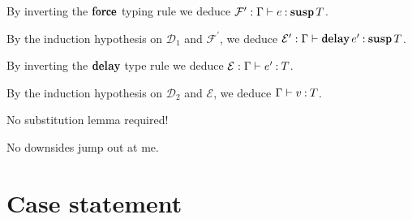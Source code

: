 \documentclass[11pt,letterpaper]{article}
\DeclareMathOperator{\DelayOp}{\mathqd{delay}}
\newcommand{\delay}{\DelayOp}
\DeclareMathOperator{\ForceOp}{\mathqd{force}}
\newcommand{\force}{\ForceOp}
\DeclareMathOperator{\SuspOp}{\mathqd{susp}}
\newcommand{\susp}{\SuspOp}
\begin{document}
\begin{enumerate}
\begin{description}
        By inverting the $\force$ typing rule
        we deduce $\mathcal{F}^\prime : \Gamma \proves e \hastype \susp T$.

        By the induction hypothesis on $\mathcal{D}_1$ and
        $\mathcal{F}^\prime$,
        we deduce
        $\mathcal{E}^\prime : \Gamma \proves \delay e^\prime \hastype \susp T$.

        By inverting the $\delay$ type rule
        we deduce $\mathcal{E} : \Gamma \vdash e^\prime \mathbin{:} T$.

        By the induction hypothesis on $\mathcal{D}_2$ and $\mathcal{E}$,
        we deduce $\Gamma \vdash v \mathbin{:} T$.
    \end{description}
    No substitution lemma required!

    No downsides jump out at me.
\end{enumerate}

\section{Case statement}
\end{document}
